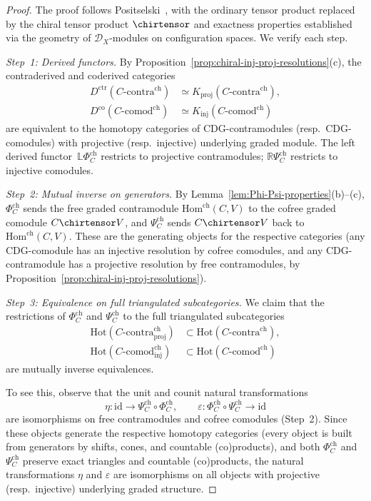 \begin{proof}
The proof follows Positselski~\cite[\S5.2]{Positselski11}, with the
ordinary tensor product replaced by the chiral tensor product
$\chirtensor$ and exactness properties established via the geometry
of $\mathcal{D}_X$-modules on configuration spaces.  We verify
each step.

\emph{Step~1: Derived functors.}
By Proposition~\ref{prop:chiral-inj-proj-resolutions}(c),
the contraderived and coderived categories
\begin{align*}
D^{\mathrm{ctr}}(C\text{-}\mathrm{contra}^{\mathrm{ch}})
&\simeq K_{\mathrm{proj}}(C\text{-}\mathrm{contra}^{\mathrm{ch}}),\\
D^{\mathrm{co}}(C\text{-}\mathrm{comod}^{\mathrm{ch}})
&\simeq K_{\mathrm{inj}}(C\text{-}\mathrm{comod}^{\mathrm{ch}})
\end{align*}
are equivalent to the homotopy categories of
CDG-contra\-modules (resp.\ CDG-comodules) with
projective (resp.\ injective) underlying graded module.
The left derived functor~$\mathbb{L}\Phi_C^{\mathrm{ch}}$
restricts to projective contramodules;
$\mathbb{R}\Psi_C^{\mathrm{ch}}$ restricts to injective comodules.

\emph{Step~2: Mutual inverse on generators.}
By Lemma~\ref{lem:Phi-Psi-properties}(b)--(c), $\Phi_C^{\mathrm{ch}}$
sends the free graded contramodule $\mathrm{Hom}^{\mathrm{ch}}(C, V)$
to the cofree graded comodule $C \chirtensor V$, and
$\Psi_C^{\mathrm{ch}}$ sends $C \chirtensor V$ back to
$\mathrm{Hom}^{\mathrm{ch}}(C, V)$.  These are the generating objects
for the respective categories (any CDG-comodule has an injective
resolution by cofree comodules, and any CDG-contramodule has a
projective resolution by free contramodules, by
Proposition~\ref{prop:chiral-inj-proj-resolutions}).

\emph{Step~3: Equivalence on full triangulated subcategories.}
We claim that the restrictions of $\Phi_C^{\mathrm{ch}}$ and
$\Psi_C^{\mathrm{ch}}$ to the full triangulated subcategories
\begin{align*}
\mathrm{Hot}(C\text{-}\mathrm{contra}^{\mathrm{ch}}_{\mathrm{proj}})
&\subset \mathrm{Hot}(C\text{-}\mathrm{contra}^{\mathrm{ch}}), \\
\mathrm{Hot}(C\text{-}\mathrm{comod}^{\mathrm{ch}}_{\mathrm{inj}})
&\subset \mathrm{Hot}(C\text{-}\mathrm{comod}^{\mathrm{ch}})
\end{align*}
are mutually inverse equivalences.

To see this, observe that the unit and counit natural transformations
\[
\eta\colon \mathrm{id} \to \Psi_C^{\mathrm{ch}} \circ \Phi_C^{\mathrm{ch}},
\qquad
\varepsilon\colon \Phi_C^{\mathrm{ch}} \circ \Psi_C^{\mathrm{ch}} \to \mathrm{id}
\]
are isomorphisms on free contramodules and cofree comodules
(Step~2).  Since these objects generate the respective
homotopy categories (every object is built from generators by
shifts, cones, and countable (co)products),
and both $\Phi_C^{\mathrm{ch}}$ and $\Psi_C^{\mathrm{ch}}$ preserve
exact triangles and countable (co)products, the natural
transformations $\eta$ and $\varepsilon$ are isomorphisms
on all objects with projective (resp.\ injective) underlying graded
structure.


\end{proof}
